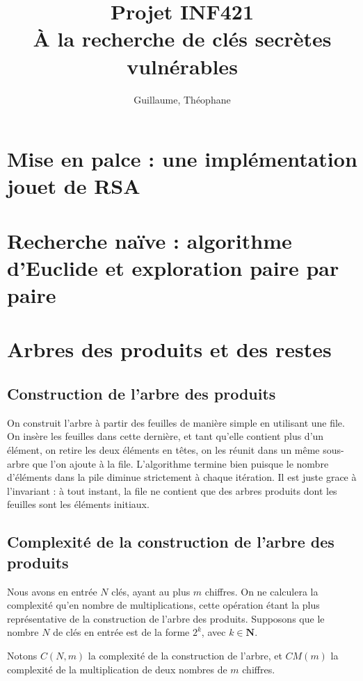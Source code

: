 \documentclass[a4paper,10pt]{article}
\title{Projet INF421 \\ À la recherche de clés secrètes vulnérables}
\author{\bsc{Hétier} Guillaume, \bsc{Hufschmitt} Théophane}
\begin{document}
\maketitle

\begin{abstract}

\end{abstract}

\section{Mise en palce : une implémentation jouet de RSA}

\section{Recherche naïve : algorithme d'Euclide et exploration paire par paire}

\section{Arbres des produits et des restes}

  \subsection{Construction de l'arbre des produits}
  On construit l'arbre à partir des feuilles de manière simple en utilisant une file. On insère les feuilles dans cette dernière, et tant qu'elle contient plus d'un élément, on retire les deux éléments en têtes, on les réunit dans un même sous-arbre que l'on ajoute à la file.
  L'algorithme termine bien puisque le nombre d'éléments dans la pile diminue strictement à chaque itération. Il est juste grace à l'invariant : à tout instant, la file ne contient que des arbres produits dont les feuilles sont les éléments initiaux.
  
  \subsection{Complexité de la construction de l'arbre des produits}
  Nous avons en entrée $N$ clés, ayant au plus $m$ chiffres.
  On ne calculera la complexité qu'en nombre de multiplications, cette opération étant la plus représentative de la construction de l'arbre des produits.
  Supposons que le nombre $N$ de clés en entrée est de la forme $2^k$, avec $k\in\mathbf{N}$.
  
  Notons $C(N,m)$ la complexité de la construction de l'arbre, et $CM(m)$ la complexité de la multiplication de deux nombres de $m$ chiffres.
  
\end{document}
